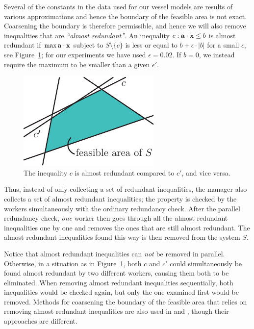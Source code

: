 Several of the constants in the data used for our vessel models are results of various approximations and hence the boundary of the feasible area is not exact. Coarsening the boundary is therefore permissible, and hence we will also remove inequalities that are \emph{``almost redundant''}. An inequality $c: \mathbf{a}\cdot\mathbf{x}\leq b$ is almost redundant if $\max \mathbf{a}\cdot\mathbf{x}$  subject to $S\setminus\{c\}$ is less or equal to $b + \epsilon\cdot |b|$ for a small $\epsilon$, see Figure~\ref{fig:almostRedundant}; for our experiments we have used $\epsilon = 0.02$. If $b=0$, we instead require the maximum to be smaller than a given $\epsilon'$. 
\begin{figure}[htbp]
	\centering
		\includegraphics[scale=0.9]{figures/almostRedundant.pdf}
	\caption{The inequality $c$ is almost redundant compared to $c'$, and vice versa.}
	\label{fig:almostRedundant}
\end{figure}
Thus, instead of only collecting a set of redundant inequalities, the manager also collects a set of almost redundant inequalities; the property is checked by the workers simultaneously with the ordinary redundancy check. After the parallel redundancy check, \emph{one} worker then goes through all the almost redundant inequalities one by one and removes the ones that are still almost redundant. The almost redundant inequalities found this way is then removed from the system $S$.  

Notice that almost redundant inequalities can \emph{not} be removed in parallel. Otherwise, in a situation as in Figure~\ref{fig:almostRedundant}, both $c$ and $c'$ could simultaneously be found almost redundant by two different workers, causing them both to be eliminated. When removing almost redundant inequalities sequentially, both inequalities would be checked again, but only the one examined first would be removed. Methods for coarsening the boundary of the feasible area that relies on removing almost redundant inequalities are also used in \cite{lukatskii08} and \cite{shapot12}, though their approaches are different.

